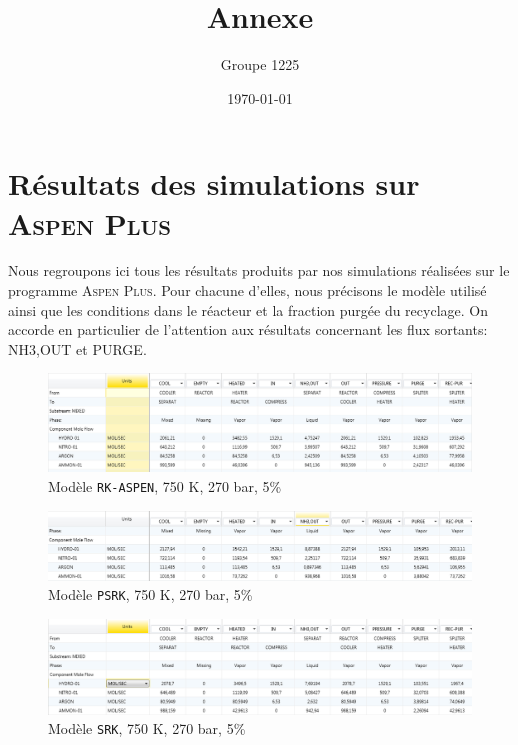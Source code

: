 \documentclass[a4paper, oneside, 12pt]{article}
\title{Annexe}
\author{Groupe 1225}
\date{\today}
\begin{document}
\maketitle

\section{Résultats des simulations sur \textsc{Aspen Plus}}
Nous regroupons ici tous les résultats produits par nos simulations réalisées sur le programme \textsc{Aspen Plus}. Pour chacune d'elles, nous précisons le modèle utilisé ainsi que les conditions dans le réacteur et la fraction purgée du recyclage. On accorde en particulier de l'attention aux résultats concernant les flux sortants: \textsc{NH3,OUT} et \textsc{PURGE}.

\graphicspath{{Img_simulations/}}

\begin{figure}[h!]
	\begin{center}
		\includegraphics[scale=0.5]{RK-ASPEN.png}
	\end{center}
	\caption{Modèle \texttt{RK-ASPEN}, 750 K, 270 bar, 5\%}
	\label{fig:RK-ASPEN}
\end{figure}


\begin{figure}[h!]
	\begin{center}
		\includegraphics[scale=0.5]{PSRK.png}
	\end{center}
	\caption{Modèle \texttt{PSRK}, 750 K, 270 bar, 5\%}
	\label{fig:PSRK}
\end{figure}

\begin{figure}[h!]
	\begin{center}
		\includegraphics[scale=0.5]{SRK,750,270,5.png}
	\end{center}
	\caption{Modèle \texttt{SRK}, 750 K, 270 bar, 5\%}
	\label{fig:SRK,750,270,0.05}
\end{figure}
\end{document}
